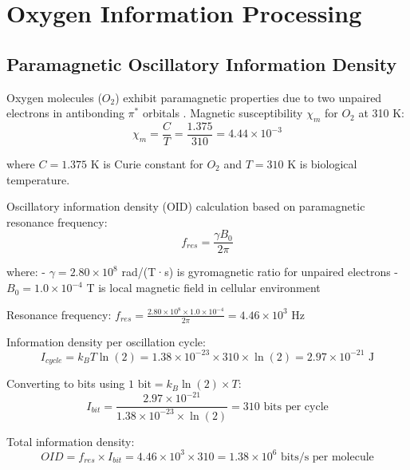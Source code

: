 
\section{Oxygen Information Processing}

\subsection{Paramagnetic Oscillatory Information Density}

Oxygen molecules ($O_2$) exhibit paramagnetic properties due to two unpaired electrons in antibonding $\pi^*$ orbitals \cite{mulliken1928assignment}. Magnetic susceptibility $\chi_m$ for $O_2$ at 310 K:
\begin{equation}
\chi_m = \frac{C}{T} = \frac{1.375}{310} = 4.44 \times 10^{-3}
\end{equation}

where $C = 1.375$ K is Curie constant for $O_2$ and $T = 310$ K is biological temperature.

Oscillatory information density (OID) calculation based on paramagnetic resonance frequency:
\begin{equation}
f_{res} = \frac{\gamma B_0}{2\pi}
\end{equation}

where:
- $\gamma = 2.80 \times 10^8$ rad/(T·s) is gyromagnetic ratio for unpaired electrons
- $B_0 = 1.0 \times 10^{-4}$ T is local magnetic field in cellular environment

Resonance frequency: $f_{res} = \frac{2.80 \times 10^8 \times 1.0 \times 10^{-4}}{2\pi} = 4.46 \times 10^3$ Hz

Information density per oscillation cycle:
\begin{equation}
I_{cycle} = k_B T \ln(2) = 1.38 \times 10^{-23} \times 310 \times \ln(2) = 2.97 \times 10^{-21} \text{ J}
\end{equation}

Converting to bits using $1 \text{ bit} = k_B \ln(2) \times T$:
\begin{equation}
I_{bit} = \frac{2.97 \times 10^{-21}}{1.38 \times 10^{-23} \times \ln(2)} = 310 \text{ bits per cycle}
\end{equation}

Total information density:
\begin{equation}
OID = f_{res} \times I_{bit} = 4.46 \times 10^3 \times 310 = 1.38 \times 10^6 \text{ bits/s per molecule}
\end{equation}

